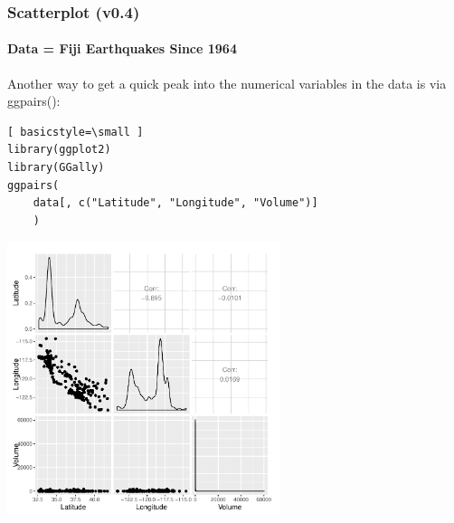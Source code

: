 \begin{frame}
\frametitle{Scatterplot (v0.4)}
  \framesubtitle{Data = Fiji Earthquakes Since 1964}

Another way to get a quick peak into the numerical variables in the data is via \ttfamily ggpairs(): \normalfont
  		\begin{lstlisting}[ basicstyle=\small ]
library(ggplot2)
library(GGally)
ggpairs(
	data[, c("Latitude", "Longitude", "Volume")]
	)
		\end{lstlisting}

        \begin{center}
         \includegraphics[width=0.6\textwidth]{images/scatterPlot_v4.pdf}
        \end{center}
\end{frame}

